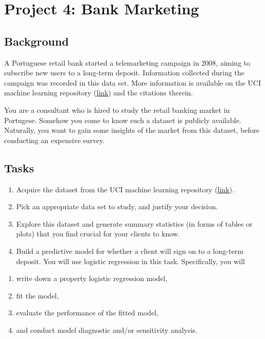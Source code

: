\documentclass[12pt,]{book}
\providecommand{\tightlist}{%
  \setlength{\itemsep}{0pt}\setlength{\parskip}{0pt}}
\begin{document}
\section{Project 4: Bank Marketing}\label{project-4-bank-marketing}

\subsection{Background}\label{background-3}

A Portuguese retail bank started a telemarketing campaign in 2008,
aiming to subscribe new users to a long-term deposit. Information
collected during the campaign was recorded in this data set. More
information is available on the UCI machine learning repository
(\href{https://archive.ics.uci.edu/ml/datasets/Bank+Marketing\#}{link})
and the citations therein.

You are a consultant who is hired to study the retail banking market in
Portugese. Somehow you come to know such a dataset is publicly
available. Naturally, you want to gain some insights of the market from
this dataset, before conducting an expensive survey.

\subsection{Tasks}\label{tasks-3}

\begin{enumerate}
\def\labelenumi{\arabic{enumi}.}
\tightlist
\item
  Acquire the dataset from the UCI machine learning repository
  (\href{https://archive.ics.uci.edu/ml/datasets/Bank+Marketing\#}{link}).
\item
  Pick an appropriate data set to study, and justify your decision.
\item
  Explore this dataset and generate summary statistics (in forms of
  tables or plots) that you find crucial for your clients to know.
\item
  Build a predictive model for whether a client will sign on to a
  long-term deposit. You will use logistic regression in this task.
  Specifically, you will
\end{enumerate}

\begin{enumerate}
\def\labelenumi{\alph{enumi}.}
\tightlist
\item
  write down a property logistic regression model,
\item
  fit the model,
\item
  evaluate the performance of the fitted model,
\item
  and conduct model diagnostic and/or sensitivity analysis.
\end{enumerate}
\end{document}
